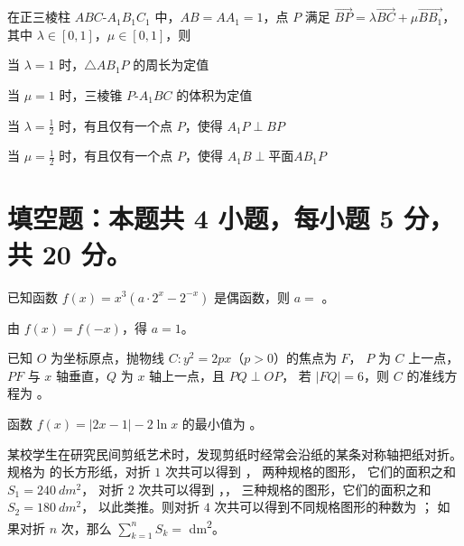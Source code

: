\documentclass{exam-zh}
\begin{document}
\begin{question}
  在正三棱柱 $ABC$-$A_1 B_1 C_1$ 中，$AB = A A_1 = 1$，点 $P$ 满足
  $\overrightarrow{BP} = \lambda \overrightarrow{BC} + \mu \overrightarrow{BB_1}$，
  其中 $\lambda \in [0, 1]$，$\mu \in [0, 1]$，则 \paren
  \begin{choices}
    \item 当 $\lambda = 1$ 时，$\triangle A B_1 P$ 的周长为定值
    \item 当 $\mu = 1$ 时，三棱锥 $P$-$A_1 B C$ 的体积为定值
    \item 当 $\lambda = \frac{1}{2}$ 时，有且仅有一个点 $P$，使得 $A_1 P \perp BP$
    \item 当 $\mu = \frac{1}{2}$ 时，有且仅有一个点 $P$，使得 $A_1 B \perp \text{平面} A B_1 P$
  \end{choices}
\end{question}



\section{填空题：本题共 4 小题，每小题 5 分，共 20 分。}

\begin{question}
  已知函数 $f(x) = x^3 (a \cdot 2^x - 2^{-x})$ 是偶函数，则 $a = $ \fillin[$1$] 。
  \begin{solution}
    由 $f(x) = f(-x)$，得 $a = 1$。
  \end{solution}
\end{question}

\begin{question}
  已知 $O$ 为坐标原点，抛物线 $C \colon y^2 = 2px$（$p > 0$）的焦点为 $F$，
  $P$ 为 $C$ 上一点，$PF$ 与 $x$ 轴垂直，$Q$ 为 $x$ 轴上一点，且 $PQ \perp OP$，
  若 $|FQ| = 6$，则 $C$ 的准线方程为 \fillin[$\dfrac{1}{3}$] 。
\end{question}

\begin{question}
  函数 $f(x) = |2x - 1| - 2 \ln x$ 的最小值为 \fillin[width = 4em][] 。
\end{question}

\begin{question}
  某校学生在研究民间剪纸艺术时，发现剪纸时经常会沿纸的某条对称轴把纸对折。
  规格为  的长方形纸，对折 $1$ 次共可以得到
  ，  两种规格的图形，
  它们的面积之和 $S_1 = \qty{240}{dm^2}$，
  对折 $2$ 次共可以得到 ，，
   三种规格的图形，它们的面积之和 $S_2 = \qty{180}{dm^2}$，
  以此类推。则对折 $4$ 次共可以得到不同规格图形的种数为 \fillin ；
  如果对折 $n$ 次，那么 $\sum_{k=1}^n S_k = $ \fillin \unit{dm^2}。
\end{question}
\end{document}
